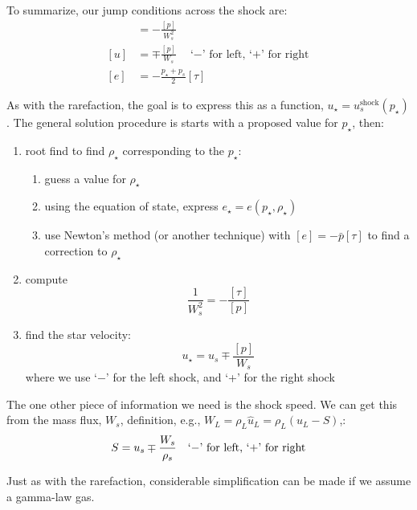 To summarize, our jump conditions across the shock are:
\begin{align}
[\tau] &= -\frac{[p]}{W_s^2} \\
[u] &= \mp \frac{[p]}{W_s} \quad\mbox{`$-$' for left, `+' for right}\\
[e] &= - \frac{p_\star + p_s}{2} [\tau] \label{eq:euler:shock:ejump}
\end{align}

As with the rarefaction, the goal is to express this as a function, $u_\star
= u_s^\mathrm{shock}(p_\star)$.  The general solution procedure is starts with
a proposed value for $p_\star$, then:
\begin{enumerate}
\item root find to find $\rho_\star$ corresponding to the $p_\star$:
  \begin{enumerate}
  \item guess a value for $\rho_\star$
  \item using the equation of state, express $e_\star = e(p_\star, \rho_\star)$
  \item use Newton's method (or another technique) with $[e] = -\bar{p} [\tau]$
     to find a correction to $\rho_\star$
  \end{enumerate}
\item compute 
  \begin{equation}
    \frac{1}{W_s^2} = - \frac{[\tau]}{[p]}
  \end{equation}
\item find the star velocity:
  \begin{equation}
    u_\star = u_s \mp \frac{[p]}{W_s}
  \end{equation}
  where we use `$-$' for the left shock, and `+' for the right shock
\end{enumerate}

The one other piece of information we need is the shock speed.  We can
get this from the mass flux, $W_s$, definition, e.g., $W_L = \rho_L
\hat{u}_L = \rho_L (u_L - S)$,:
\begin{equation}
S = u_s \mp \frac{W_s}{\rho_s} \quad\mbox{`$-$' for left, `+' for right}\\
\end{equation}

Just as with the rarefaction, considerable simplification can be made if 
we assume a gamma-law gas.

